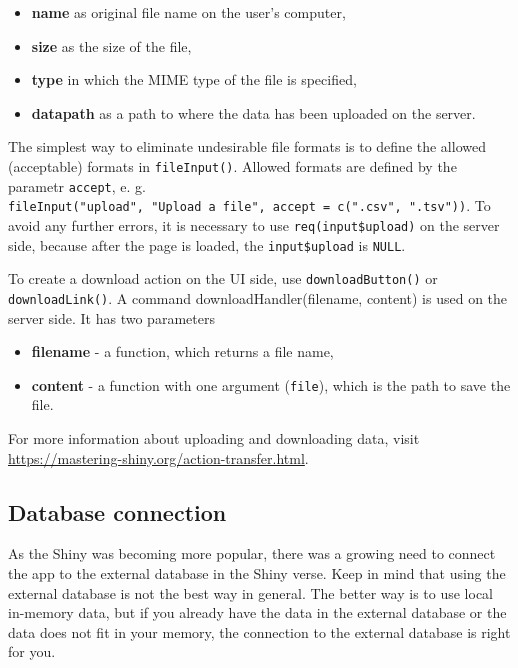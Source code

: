 \documentclass[
]{article}
\providecommand{\tightlist}{%
  \setlength{\itemsep}{0pt}\setlength{\parskip}{0pt}}
\begin{document}
\begin{itemize}
\tightlist
\item
  \textbf{name} as original file name on the user's computer,
\item
  \textbf{size} as the size of the file,
\item
  \textbf{type} in which the MIME type of the file is specified,
\item
  \textbf{datapath} as a path to where the data has been uploaded on the
  server.
\end{itemize}

The simplest way to eliminate undesirable file formats is to define the
allowed (acceptable) formats in \texttt{fileInput()}. Allowed formats
are defined by the parametr \texttt{accept}, e. g.
\texttt{fileInput("upload",\ "Upload\ a\ file",\ accept\ =\ c(".csv",\ ".tsv"))}.
To avoid any further errors, it is necessary to use
\texttt{req(input\$upload)} on the server side, because after the page
is loaded, the \texttt{input\$upload} is \texttt{NULL}.

To create a download action on the UI side, use
\texttt{downloadButton()} or \texttt{downloadLink()}. A command
downloadHandler(filename, content) is used on the server side. It has
two parameters

\begin{itemize}
\tightlist
\item
  \textbf{filename} - a function, which returns a file name,
\item
  \textbf{content} - a function with one argument (\texttt{file}), which
  is the path to save the file.
\end{itemize}

For more information about uploading and downloading data, visit
\url{https://mastering-shiny.org/action-transfer.html}.

\hypertarget{database-connection}{%
\subsection{Database connection}\label{database-connection}}

As the Shiny was becoming more popular, there was a growing need to
connect the app to the external database in the Shiny verse. Keep in
mind that using the external database is not the best way in general.
The better way is to use local in-memory data, but if you already have
the data in the external database or the data does not fit in your
memory, the connection to the external database is right for you.
\end{document}
